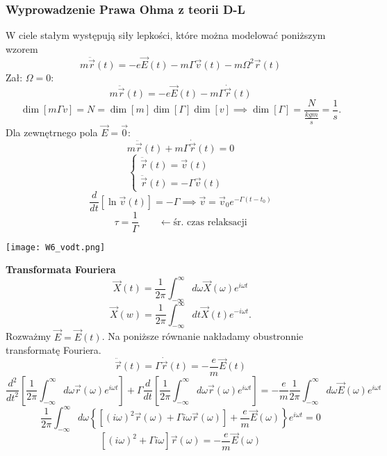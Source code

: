 \subsubsection{Wyprowadzenie Prawa Ohma z teorii D-L}
W ciele stałym występują siły lepkości, które można modelować poniższym wzorem
\begin{equation}
m\ddot{\vec{r}}(t) = -e\vec{E}(t)-m\Gamma \vec{v}(t) - m\Omega^2\vec{r}(t)
\end{equation}
Zał: $\Omega=0$:
\begin{equation}
m\ddot{\vec{r}}(t)=-e\vec{E}(t) - m\Gamma \dot{\vec{r}}(t)
\end{equation}
$$\dim[m\Gamma v]=N = \dim[m]\dim[\Gamma]\dim[v] \implies \dim[\Gamma]=
\dfrac{N}{\frac{kgm}{s}} = \dfrac{1}{s}.$$
Dla zewnętrnego pola $\vec{E}=\vec{0}$: 
\begin{equation}
m\ddot{\vec{r}}(t)+ m\Gamma \dot{\vec{r}}(t)=0
\end{equation}
$$\begin{cases}
\ddot{\vec{r}}(t)=\vec{v}(t) &\\
\ddot{\vec{r}}(t)=-\Gamma \vec{v}(t)
\end{cases} $$
$$\dfrac{d}{dt} [ \ln \vec{v}(t) ] = -\Gamma \implies \vec{v}=\vec{v}_0 
e^{-\Gamma (t-t_0)}$$
$$\tau = \dfrac{1}{\Gamma} \qquad \leftarrow \mbox{śr. czas relaksacji}$$
\begin{center} \texttt{[image: W6\_vodt.png]}\end{center}
\textbf{Transformata Fouriera}
$$\vec{X}(t) = \dfrac{1}{2\pi} \int_{-\infty}^{\infty} d\omega \vec{X}(\omega)
e^{i\omega t}$$
$$\vec{X}(w) = \dfrac{1}{2\pi} \int_{-\infty}^{\infty} dt \vec{X}(t)
e^{-i\omega t}.$$
Rozważmy $\vec{E} = \vec{E}(t)$. Na poniższe równanie nakładamy obustronnie 
transformatę Fouriera. 
\begin{equation}
\ddot{\vec{r}}(t) = \Gamma \dot{\vec{r}}(t) = -\dfrac{e}{m} \vec{E}(t) 
\end{equation}
$$\dfrac{d^2}{dt^2} \left[ \frac{1}{2\pi} \int_{-\infty}^{\infty} d\omega
\vec{r}(\omega) e^{i\omega t}\right]
+ \Gamma \dfrac{d}{dt} \left[ \frac{1}{2\pi} \int_{-\infty}^{\infty} d\omega
\vec{r}(\omega)e^{i\omega t}\right]=-
\dfrac{e}{m} \frac{1}{2\pi} \int_{-\infty}^{\infty} d\omega \vec{E}(\omega)
e^{i\omega t}
$$
$$\dfrac{1}{2\pi} \int_{-\infty}^{\infty} d\omega \left\{ \left[ 
(i\omega)^2 \vec{r}(\omega) + \Gamma i\omega \vec{r}(\omega)\right]
+ \frac{e}{m}\vec{E}(\omega)\right\}e^{i\omega t}=0$$
$$ \left[ (i\omega)^2 + \Gamma i \omega \right] \vec{r}(\omega) =
-\dfrac{e}{m} \vec{E}(\omega)$$
